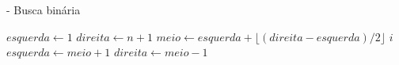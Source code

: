 
\begin{algorithm}
    \caption{ - Busca binária \cite[p. 410]{knuth1998art}}
    \begin{algorithmic}[1]
        \STATE $esquerda \leftarrow 1$
        \STATE $direita \leftarrow n + 1$
            \STATE $meio \leftarrow esquerda + \lfloor (direita - esquerda) / 2 \rfloor$
                \RETURN $ i $
                \STATE $esquerda \leftarrow meio + 1$
            \ELSE
                \STATE $direita \leftarrow meio - 1$
            \ENDIF
        \ENDWHILE
        \RETURN \FALSE
    \end{algorithmic}
    \label{alg:busca_binaria}
\end{algorithm}